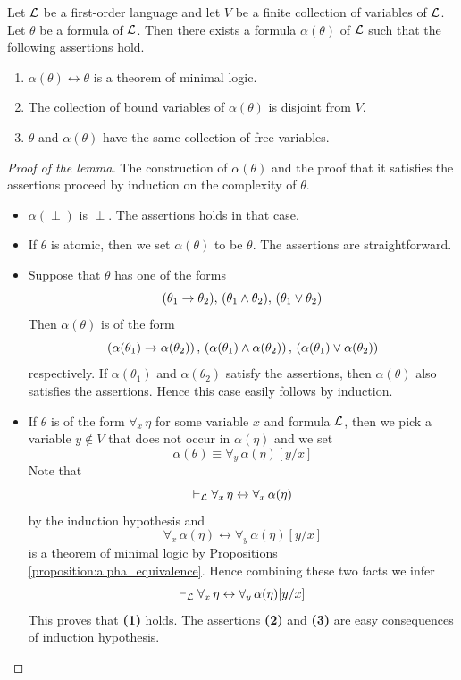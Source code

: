 \documentclass[10pt]{amsart}
\begin{document}
\begin{lemma}\label{lemma:alphabetic_variant}
	Let ${\mathcal L}$ be a first-order language and let $V$ be a finite collection of variables of ${\mathcal L}$. Let $\theta$ be a formula of ${\mathcal L}$. Then there exists a formula $\alpha(\theta)$ of ${\mathcal L}$ such that the following assertions hold.
	\begin{enumerate}[label=\emph{\textbf{(\arabic*)}}, leftmargin=3.0em]
    \item $\alpha(\theta) \leftrightarrow \theta$ is a theorem of minimal logic.
		\item The collection of bound variables of $\alpha(\theta)$ is disjoint from $V$.
		\item $\theta$ and $\alpha(\theta)$ have the same collection of free variables.
	\end{enumerate}
\end{lemma}
\begin{proof}[Proof of the lemma]
	The construction of $\alpha(\theta)$ and the proof that it satisfies the assertions proceed by induction on the complexity of $\theta$.
	\begin{itemize}
    \item $\alpha(\perp)$ is $\perp$. The assertions holds in that case.
		\item If $\theta$ is atomic, then we set $\alpha(\theta)$ to be $\theta$. The assertions are straightforward.
		\item Suppose that $\theta$ has one of the forms
		      $$(\theta_1 \rightarrow \theta_2),\,(\theta_1 \wedge \theta_2),\,(\theta_1 \vee \theta_2)$$
		      Then $\alpha(\theta)$ is of the form
          $$\left(\alpha(\theta_1) \rightarrow \alpha(\theta_2)\right),\,\left(\alpha(\theta_1) \wedge \alpha(\theta_2)\right),\,(\alpha(\theta_1) \vee \alpha(\theta_2))$$
          respectively. If $\alpha(\theta_1)$ and $\alpha(\theta_2)$ satisfy the assertions, then $\alpha(\theta)$ also satisfies the assertions. Hence this case easily follows by induction.
		\item If $\theta$ is of the form $\forall_x\,\eta$ for some variable $x$ and formula ${\mathcal L}$, then we pick a variable $y \not \in V$ that does not occur in $\alpha(\eta)$ and we set
      $$\alpha(\theta) \equiv \forall_y\,\alpha(\eta)[y/x]$$
      Note that
      $$\vdash_{{\mathcal L}} \forall_x\,\eta \leftrightarrow \forall_x\,\alpha(\eta)$$
      by the induction hypothesis and
      $$\forall_x\,\alpha(\eta) \leftrightarrow \forall_y\,\alpha(\eta)[y/x]$$
      is a theorem of minimal logic by Propositions \ref{proposition:alpha_equivalence}. Hence combining these two facts we infer
      $$\vdash_{{\mathcal L}} \forall_x\,\eta \leftrightarrow \forall_y\,\alpha(\eta)[y/x]$$
      This proves that \textbf{(1)} holds. The assertions \textbf{(2)} and \textbf{(3)} are easy consequences of induction hypothesis.
	\end{itemize}
\end{proof}
\end{document}
